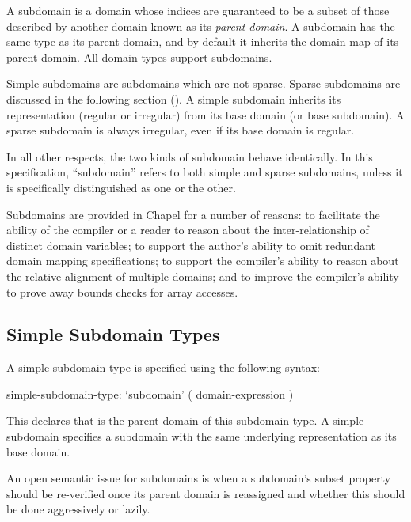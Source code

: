 A subdomain is a domain whose indices are guaranteed to be a subset of
those described by another domain known as its \emph{parent domain}.
A subdomain has the same type as its parent domain, and by default
it inherits the domain map of its parent domain.  All domain types
support subdomains.

Simple subdomains are subdomains which are not sparse.  Sparse
subdomains are discussed in the following section
().  A simple subdomain
inherits its representation (regular or irregular) from its base
domain (or base subdomain).  A sparse subdomain is always irregular,
even if its base domain is regular.

In all other respects, the two kinds of subdomain behave identically.  In this
specification, ``subdomain'' refers to both simple and sparse subdomains, unless
it is specifically distinguished as one or the other.

\begin{rationale}
Subdomains are provided in Chapel for a number of reasons: to
facilitate the ability of the compiler or a reader to reason about the
inter-relationship of distinct domain variables; to support the
author's ability to omit redundant domain mapping specifications; to
support the compiler's ability to reason about the relative alignment
of multiple domains; and to improve the compiler's ability to prove
away bounds checks for array accesses.
\end{rationale}

\subsection{Simple Subdomain Types}
\label{Simple_Subdomain_Types}

A simple subdomain type is specified using the following syntax:
\begin{syntax}
simple-subdomain-type:
  `subdomain' ( domain-expression )
\end{syntax}

This declares that  is the parent domain of
this subdomain type.  A simple subdomain specifies a subdomain
with the same underlying representation as its base domain.  

\begin{openissue}

An open semantic issue for subdomains is when a subdomain's subset
property should be re-verified once its parent domain is reassigned
and whether this should be done aggressively or lazily.

\end{openissue}

